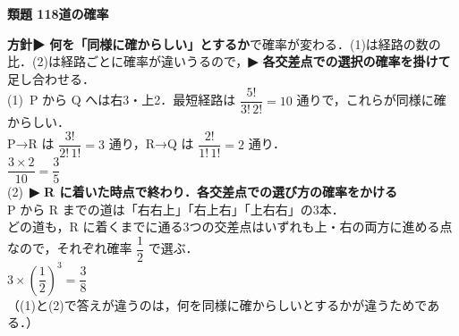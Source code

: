 \documentclass[a4paper,11pt]{ltjsarticle}
\newcommand{\ans}[2]{\Needspace{5\baselineskip}\vspace{6pt}%
  {\sffamily\bfseries 類題 #1\quad #2}\par}
\newcommand{\point}[1]{\textsf{\bfseries ▶ #1}}
\begin{document}
\ans{118}{道の確率}
\begin{kai}
\textbf{方針}\quad \point{何を「同様に確からしい」とするか}で確率が変わる．(1)は経路の数の比．(2)は経路ごとに確率が違いうるので，\point{各交差点での選択の確率を掛けて}足し合わせる．\\[2pt]
(1)\ P から Q へは右3・上2．最短経路は $\dfrac{5!}{3!\,2!}=10$ 通りで，これらが同様に確からしい．\\
\hspace*{1.5em}P→R は $\dfrac{3!}{2!\,1!}=3$ 通り，R→Q は $\dfrac{2!}{1!\,1!}=2$ 通り．\\
\hspace*{1.5em}$\dfrac{3\times2}{10}=\dfrac35$\\[2pt]
(2)\ \point{R に着いた時点で終わり．各交差点での選び方の確率をかける}\\
\hspace*{1.5em}P から R までの道は「右右上」「右上右」「上右右」の3本．\\
\hspace*{1.5em}どの道も，R に着くまでに通る3つの交差点はいずれも上・右の両方に進める点なので，それぞれ確率 $\dfrac12$ で選ぶ．\\
\hspace*{1.5em}$3\times\left(\dfrac12\right)^3=\dfrac38$\\
\hspace*{1.5em}（(1)と(2)で答えが違うのは，何を同様に確からしいとするかが違うためである．）
\end{kai}
\end{document}
